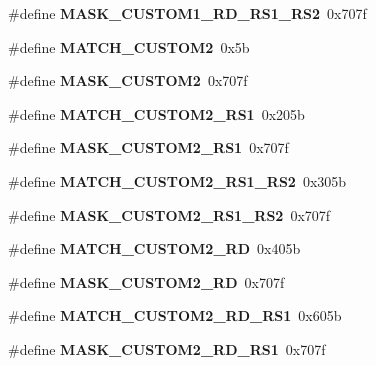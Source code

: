 \begin{DoxyCompactItemize}
\#define {\bfseries M\+A\+S\+K\+\_\+\+C\+U\+S\+T\+O\+M1\+\_\+\+R\+D\+\_\+\+R\+S1\+\_\+\+R\+S2}~0x707f
\item 
\mbox{\label{riscv-utility_8h_a5abb76a2fde423a4eb5a4566ff035a0f}} 
\#define {\bfseries M\+A\+T\+C\+H\+\_\+\+C\+U\+S\+T\+O\+M2}~0x5b
\item 
\mbox{\label{riscv-utility_8h_a92ef80463dfec585e922f2967e4b8ad0}} 
\#define {\bfseries M\+A\+S\+K\+\_\+\+C\+U\+S\+T\+O\+M2}~0x707f
\item 
\mbox{\label{riscv-utility_8h_a804a0c46ac41147bc8224cfb372a8a4d}} 
\#define {\bfseries M\+A\+T\+C\+H\+\_\+\+C\+U\+S\+T\+O\+M2\+\_\+\+R\+S1}~0x205b
\item 
\mbox{\label{riscv-utility_8h_a47f3bbc0a174998ed8ea6acbc1d9b965}} 
\#define {\bfseries M\+A\+S\+K\+\_\+\+C\+U\+S\+T\+O\+M2\+\_\+\+R\+S1}~0x707f
\item 
\mbox{\label{riscv-utility_8h_a414e6772b5192d0694aa8eab6a3d0fbc}} 
\#define {\bfseries M\+A\+T\+C\+H\+\_\+\+C\+U\+S\+T\+O\+M2\+\_\+\+R\+S1\+\_\+\+R\+S2}~0x305b
\item 
\mbox{\label{riscv-utility_8h_ad30ef0f2284ccea695c31931fd9d3e3b}} 
\#define {\bfseries M\+A\+S\+K\+\_\+\+C\+U\+S\+T\+O\+M2\+\_\+\+R\+S1\+\_\+\+R\+S2}~0x707f
\item 
\mbox{\label{riscv-utility_8h_a73849f63413fc7fb361c78c75175617a}} 
\#define {\bfseries M\+A\+T\+C\+H\+\_\+\+C\+U\+S\+T\+O\+M2\+\_\+\+RD}~0x405b
\item 
\mbox{\label{riscv-utility_8h_aa4a6d262abe511f15f1be5ffc82c9095}} 
\#define {\bfseries M\+A\+S\+K\+\_\+\+C\+U\+S\+T\+O\+M2\+\_\+\+RD}~0x707f
\item 
\mbox{\label{riscv-utility_8h_ab9f2c53c12206fd8d451bf610dc50418}} 
\#define {\bfseries M\+A\+T\+C\+H\+\_\+\+C\+U\+S\+T\+O\+M2\+\_\+\+R\+D\+\_\+\+R\+S1}~0x605b
\item 
\mbox{\label{riscv-utility_8h_a24a19181bc4a41376b395ca3b7b0536f}} 
\#define {\bfseries M\+A\+S\+K\+\_\+\+C\+U\+S\+T\+O\+M2\+\_\+\+R\+D\+\_\+\+R\+S1}~0x707f

\end{DoxyCompactItemize}
